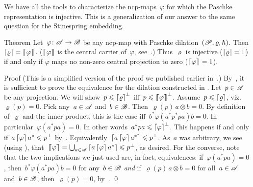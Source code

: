 \begin{parsec}%
\begin{point}%
We have all the tools to characterize
    the ncp-maps~$\varphi$
    for which the Paschke representation is injective.
This is a generalization of our answer\cite{stineinj}
    to the same question for the Stinespring embedding.
\end{point}
\begin{point}{Theorem}%
Let~$\varphi\colon \mathscr{A} \to \mathscr{B}$ be any ncp-map
    with Paschke dilation~$(\mathscr{P}, \varrho, h)$.
Then $\left\lceil\varrho\right\rceil = \left\lceil\!\!\left\lceil\varphi\right\rceil\!\!\right\rceil$.
($\left\lceil\!\!\left\lceil\varphi\right\rceil\!\!\right\rceil$ is the central carrier of~$\varphi$, see~.)
Thus~$\varrho$ is injective ($\left\lceil\varrho\right\rceil=1$) if and only if $\varphi$
maps no non-zero central projection to zero ($\left\lceil\!\!\left\lceil\varphi\right\rceil\!\!\right\rceil=1$).
\begin{point}{Proof}%
(This is a simplified version of the proof we published earlier
    in~\cite[Thm.~30]{paschke}.)
By~,
    it is sufficient to prove the equivalence
    for the dilation constructed in .
Let~$p \in \mathscr{A}$ be any projection.
We will show~$p \leqslant \left\lceil\varrho\right\rceil^\perp$ iff~$p \leqslant \left\lceil\!\!\left\lceil\varphi\right\rceil\!\!\right\rceil^\perp$.
Assume~$p \leqslant \left\lceil\varrho\right\rceil$,
    viz.~$\varrho(p) = 0$.
Pick any~$a \in \mathscr{A}$ and~$b\in \mathscr{B}$.
Then~$\varrho(p)\, a\otimes b = 0$.
By definition of~$\varrho$ and the inner product,
    this is the case iff~$b^* \varphi(a^*p^* pa) b = 0$.
In particular~$\varphi(a^* p a) = 0$.
In other words~$a^* p a \leqslant \left\lceil\varphi\right\rceil^\perp$.
This happens if and only if~$a \left\lceil\varphi\right\rceil a^* \leqslant p^\perp$
    by~.
Equivalently~$\left\lceil a \left\lceil\varphi\right\rceil a^*\right\rceil \leqslant p^\perp$.
As~$a$ was arbitrary,
    we see (using ),
    that~$\left\lceil\!\!\left\lceil\varphi\right\rceil\!\!\right\rceil = \bigcup_{a \in \mathscr{A}} \left\lceil a \left\lceil\varphi\right\rceil a^*\right\rceil
            \leqslant p^\perp$, as desired.
For the converse, note that
    the two implications we just used are, in fact, equivalences:
        if~$\varphi(a^* p a) =0$,
        then~$b^*\varphi(a^* pa) b = 0$ for any~$b \in \mathscr{B}$
        \emph{and} if~$\varrho(p)\, a \otimes b = 0$
        for all~$a \in \mathscr{A}$ and~$b\in \mathscr{B}$,
        then~$\varrho(p) = 0$, by~.
\qed
\end{point}
\end{point}
\end{parsec}

